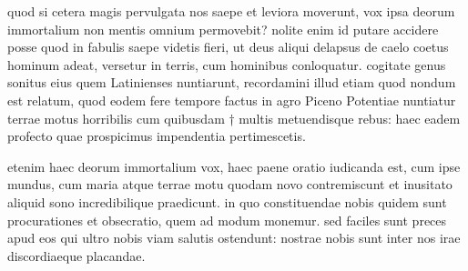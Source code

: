  quod si cetera magis pervulgata nos saepe et leviora moverunt, vox ipsa deorum immortalium non mentis omnium permovebit? nolite enim id putare accidere posse quod in fabulis saepe videtis fieri, ut deus aliqui delapsus de caelo coetus hominum adeat, versetur in terris, cum hominibus conloquatur. cogitate genus sonitus eius quem Latinienses nuntiarunt, recordamini illud etiam quod nondum est relatum, quod eodem fere tempore factus in agro Piceno Potentiae nuntiatur terrae motus horribilis cum quibusdam † multis metuendisque rebus: haec eadem profecto quae prospicimus impendentia pertimescetis.

 etenim haec deorum immortalium vox, haec paene oratio iudicanda est, cum ipse mundus, cum maria atque terrae motu quodam novo contremiscunt et inusitato aliquid sono incredibilique praedicunt. in quo constituendae nobis quidem sunt procurationes et obsecratio, quem ad modum monemur. sed faciles sunt preces apud eos qui ultro nobis viam salutis ostendunt: nostrae nobis sunt inter nos irae discordiaeque placandae.
